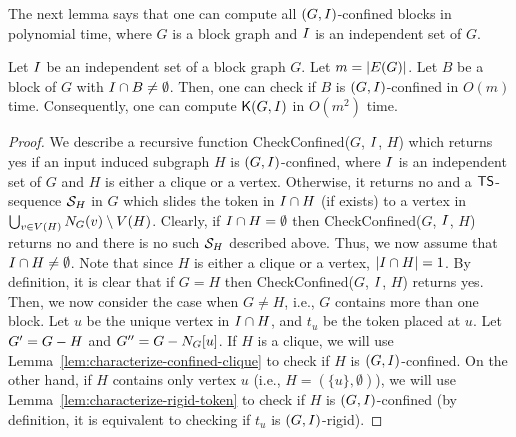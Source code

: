 \documentclass[a4paper]{llncs}
\begin{document}
The next lemma says that one can compute all $(G, I)$-confined blocks in polynomial time, where $G$ is a block graph and $I$ is an independent set of $G$.


\begin{lemma}
\label{lem:check-confined-in-polytime}
Let $I$ be an independent set of a block graph $G$.
Let $m = {\left|E(G)\right|}$.
Let $B$ be a block of $G$ with $I \cap B \neq \emptyset$.
Then, one can check if $B$ is $(G, I)$-confined in $O(m)$ time.
Consequently, one can compute ${\mathsf K}{(G, I)}$ in $O(m^2)$ time.
\end{lemma}



\begin{proof}

We describe a recursive function {\sc CheckConfined}($G$, $I$, $H$) which returns {\sc yes} if an input induced subgraph $H$ is $(G, I)$-confined, where $I$ is an independent set of $G$ and $H$ is either a clique or a vertex.
Otherwise, it returns {\sc no} and a ${\sf TS}$-sequence ${\cal S}_H$ in $G$ which slides the token in $I \cap H$ (if exists) to a vertex in $\bigcup_{v \in V(H)}N_{G}(v) \setminus V(H)$.
Clearly, if $I \cap H = \emptyset$ then {\sc CheckConfined}($G$, $I$, $H$) returns {\sc no} and there is no such ${\cal S}_H$ described above.
Thus, we now assume that $I \cap H \neq \emptyset$.
Note that since $H$ is either a clique or a vertex, ${\left|I \cap H\right|} = 1$.
By definition, it is clear that if $G = H$ then {\sc CheckConfined}($G$, $I$, $H$) returns {\sc yes}.
Then, we now consider the case when $G \neq H$, i.e., $G$ contains more than one block.
Let $u$ be the unique vertex in $I \cap H$, and $t_u$ be the token placed at $u$.
Let ${G^\prime} = G - H$ and $G^{\prime\prime} = G - N_{G}[u]$.
If $H$ is a clique, we will use Lemma~\ref{lem:characterize-confined-clique} to check if $H$ is $(G, I)$-confined.
On the other hand, if $H$ contains only vertex $u$ (i.e., $H = (\{u\}, \emptyset)$), we will use Lemma~\ref{lem:characterize-rigid-token} to check if $H$ is $(G, I)$-confined (by definition, it is equivalent to checking if $t_u$ is $(G, I)$-rigid).


\end{proof}
\end{document}
